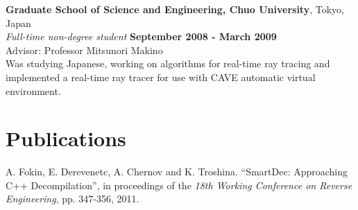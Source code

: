 \documentclass[margin,line]{CV}
\begin{document}
\begin{resume}
    \textbf{Graduate School of Science and Engineering, Chuo University}, Tokyo, Japan \vspace{2mm}\\\vspace{1mm}%
    \textsl{Full-time non-degree student} \hfill \textbf{September 2008 - March 2009}\vspace{1mm}\\
    Advisor: Professor Mitsunori Makino \\
	Was studying Japanese, working on algorithms for real-time ray tracing and implemented a real-time ray tracer for use with CAVE automatic virtual environment.





    \section{\mysidestyle Publications}
    A. Fokin, E. Derevenetc, A. Chernov and K. Troshina. ``SmartDec: Approaching C++ Decompilation'',
	in proceedings of the \textsl{18th Working Conference on Reverse Engineering}, pp. 347-356, 2011.
	

\end{resume}
\end{document}
